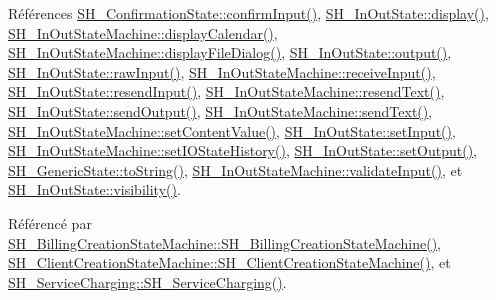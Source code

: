 Références \hyperlink{classSH__ConfirmationState_a039267260de5d102ac7511e6a5fae87f}{S\-H\-\_\-\-Confirmation\-State\-::confirm\-Input()}, \hyperlink{classSH__InOutState_a616f88b20478b81b2927a9ddc2b4f521}{S\-H\-\_\-\-In\-Out\-State\-::display()}, \hyperlink{classSH__InOutStateMachine_ab3a12d1f9b658d8ffdc17669a6c065f2}{S\-H\-\_\-\-In\-Out\-State\-Machine\-::display\-Calendar()}, \hyperlink{classSH__InOutStateMachine_abd206c3bc32bb7690df9c3e1cd546ebc}{S\-H\-\_\-\-In\-Out\-State\-Machine\-::display\-File\-Dialog()}, \hyperlink{classSH__InOutState_a17ed7eaf5e3ed5af80a4f9fe65d5bfd9}{S\-H\-\_\-\-In\-Out\-State\-::output()}, \hyperlink{classSH__InOutState_a4c674a54f41d2e6ef951b22393dcd89f}{S\-H\-\_\-\-In\-Out\-State\-::raw\-Input()}, \hyperlink{classSH__InOutStateMachine_a037ed5e13ecfae2123a8d4940292e410}{S\-H\-\_\-\-In\-Out\-State\-Machine\-::receive\-Input()}, \hyperlink{classSH__InOutState_a1f00480afefd173002cf56d4c4128048}{S\-H\-\_\-\-In\-Out\-State\-::resend\-Input()}, \hyperlink{classSH__InOutStateMachine_a526822c66b46aa0cd81ba4473fa5573f}{S\-H\-\_\-\-In\-Out\-State\-Machine\-::resend\-Text()}, \hyperlink{classSH__InOutState_a77921c5f42059bc97361f4ff7827da12}{S\-H\-\_\-\-In\-Out\-State\-::send\-Output()}, \hyperlink{classSH__InOutStateMachine_a5e7f5958bae31696b6a8deab94ad2b4f}{S\-H\-\_\-\-In\-Out\-State\-Machine\-::send\-Text()}, \hyperlink{classSH__InOutStateMachine_a9ab1534306b2bdb62743d4bcefe40c17}{S\-H\-\_\-\-In\-Out\-State\-Machine\-::set\-Content\-Value()}, \hyperlink{classSH__InOutState_aaec9c2b5ef7c406bff7469461352d47c}{S\-H\-\_\-\-In\-Out\-State\-::set\-Input()}, \hyperlink{classSH__InOutStateMachine_acbcce2c4300af1634d928b30e5e9be1c}{S\-H\-\_\-\-In\-Out\-State\-Machine\-::set\-I\-O\-State\-History()}, \hyperlink{classSH__InOutState_af611c84134e262739cd834797b315c80}{S\-H\-\_\-\-In\-Out\-State\-::set\-Output()}, \hyperlink{classSH__GenericState_a7779babbb40f3f8faa71112204d9804f}{S\-H\-\_\-\-Generic\-State\-::to\-String()}, \hyperlink{classSH__InOutStateMachine_aec1b3fef3c1f82499aa1f73beaecd08a}{S\-H\-\_\-\-In\-Out\-State\-Machine\-::validate\-Input()}, et \hyperlink{classSH__InOutState_a3a18752c4122c26a2ebf38310c9c1b75}{S\-H\-\_\-\-In\-Out\-State\-::visibility()}.



Référencé par \hyperlink{classSH__BillingCreationStateMachine_ad62b77fa4aeafe200056ff3974562f83}{S\-H\-\_\-\-Billing\-Creation\-State\-Machine\-::\-S\-H\-\_\-\-Billing\-Creation\-State\-Machine()}, \hyperlink{classSH__ClientCreationStateMachine_a0b406b0f404c0fd33bf35be8ce0cc811}{S\-H\-\_\-\-Client\-Creation\-State\-Machine\-::\-S\-H\-\_\-\-Client\-Creation\-State\-Machine()}, et \hyperlink{classSH__ServiceCharging_afa5273d046049b1c2b020a6a19a8290b}{S\-H\-\_\-\-Service\-Charging\-::\-S\-H\-\_\-\-Service\-Charging()}.


